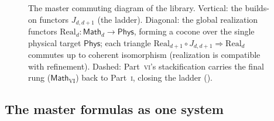 \documentclass[12pt]{article}
\theoremstyle{definition}
\theoremstyle{remark}
\newcommand{\Math}{\mathsf{Math}}
\newcommand{\Phys}{\mathsf{Phys}}
\newcommand{\Real}{\mathrm{Real}}
\newcommand{\PI}{\textsc{i}}
\newcommand{\PVI}{\textsc{vi}}
\begin{document}
\begin{figure}[t]
\centering
{}
\caption{The master commuting diagram of the library.  Vertical: the builds-on
functors $J_{d,d+1}$ (the ladder).  Diagonal: the global realization functors
$\Real_d:\Math_d\to\Phys$, forming a cocone over the single physical target
$\Phys$; each triangle
$\Real_{d+1}\circ J_{d,d+1}\Rightarrow\Real_d$ commutes up to coherent isomorphism
(realization is compatible with refinement).  Dashed: Part~\PVI's stackification
carries the final rung ($\Math_{\mathrm{VI}}$) back to Part~\PI, closing the ladder
().}
\label{fig:master}
\end{figure}

\subsection{The master formulas as one system}
\label{sec:masterformulas}
\end{document}
